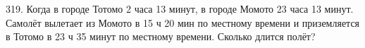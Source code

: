 319. Когда в городе Тотомо 2 часа 13 минут, в городе Момото 23 часа 13 минут. Самолёт вылетает из Момото в 15 ч 20 мин по местному времени и приземляется в Тотомо в
23 ч 35 минут по местному времени. Сколько длится полёт?\\
